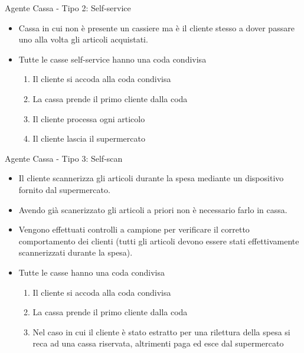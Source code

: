 \begin{frame}{Agente Cassa - Tipo 2: Self-service}
	
	\begin{itemize}
		\item Cassa in cui non è presente un cassiere ma è il cliente stesso a dover passare uno alla volta gli articoli acquistati.
		\item Tutte le casse self-service hanno una coda condivisa
		\begin{enumerate}
			\item Il cliente si accoda alla coda condivisa
			\item La cassa prende il primo cliente dalla coda
			\item Il cliente processa ogni articolo
			\item Il cliente lascia il supermercato
		\end{enumerate}		
	\end{itemize}
\end{frame}

\begin{frame}{Agente Cassa - Tipo 3: Self-scan}
	
	\begin{itemize}
		\item Il cliente scannerizza gli articoli durante la spesa mediante un dispositivo fornito dal supermercato.
		\item Avendo già scanerizzato gli articoli a priori non è necessario farlo in cassa.
		\item Vengono effettuati controlli a campione per verificare il corretto comportamento dei clienti (tutti gli articoli devono essere stati effettivamente scannerizzati durante la spesa).
		\item Tutte le casse hanno una coda condivisa
		\begin{enumerate}
			\item Il cliente si accoda alla coda condivisa
			\item La cassa prende il primo cliente dalla coda
			\item Nel caso in cui il cliente è stato estratto per una rilettura della spesa si reca ad una cassa riservata, altrimenti paga ed esce dal supermercato
		\end{enumerate}		
	\end{itemize}
\end{frame}

